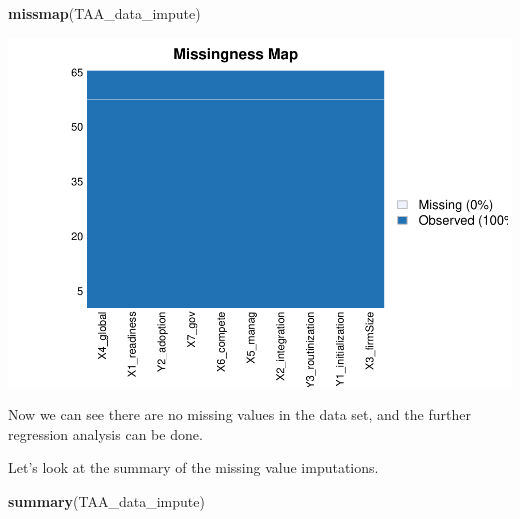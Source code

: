 \documentclass[
]{article}
\newenvironment{Shaded}{\begin{snugshade}}{\end{snugshade}}
\newcommand{\KeywordTok}[1]{\textcolor[rgb]{0.13,0.29,0.53}{\textbf{#1}}}
\newcommand{\NormalTok}[1]{#1}
\begin{document}
\begin{Shaded}
\begin{Highlighting}[]
\KeywordTok{missmap}\NormalTok{(TAA_data_impute)}
\end{Highlighting}
\end{Shaded}

\includegraphics{markdown_report_files/figure-latex/unnamed-chunk-13-1.pdf}

Now we can see there are no missing values in the data set, and the
further regression analysis can be done.

Let's look at the summary of the missing value imputations.

\begin{Shaded}
\begin{Highlighting}[]
\KeywordTok{summary}\NormalTok{(TAA_data_impute)}
\end{Highlighting}
\end{Shaded}
\end{document}
